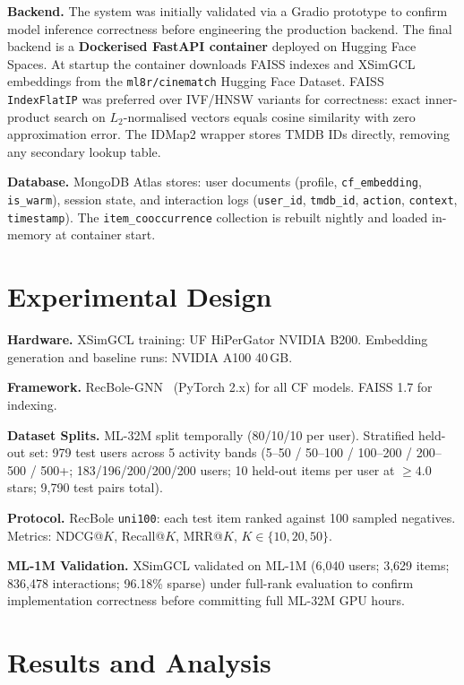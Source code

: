 \documentclass[conference]{IEEEtran}
\begin{document}
\textbf{Backend.}
The system was initially validated via a Gradio prototype to confirm
model inference correctness before engineering the production backend.
The final backend is a \textbf{Dockerised FastAPI container} deployed on
Hugging Face Spaces.
At startup the container downloads FAISS indexes and XSimGCL embeddings
from the \texttt{ml8r/cinematch} Hugging Face Dataset.
FAISS \texttt{IndexFlatIP} was preferred over IVF/HNSW variants for
correctness: exact inner-product search on $L_2$-normalised vectors
equals cosine similarity with zero approximation error.
The IDMap2 wrapper stores TMDB IDs directly, removing any secondary
lookup table.

\textbf{Database.}
MongoDB Atlas stores: user documents (profile, \texttt{cf\_embedding},
\texttt{is\_warm}), session state, and interaction logs
(\texttt{user\_id}, \texttt{tmdb\_id}, \texttt{action},
\texttt{context}, \texttt{timestamp}).
The \texttt{item\_cooccurrence} collection is rebuilt nightly and
loaded in-memory at container start.

\section{Experimental Design}
\label{sec:expdesign}

\textbf{Hardware.}
XSimGCL training: UF HiPerGator NVIDIA B200.
Embedding generation and baseline runs: NVIDIA A100 40\,GB.

\textbf{Framework.}
RecBole-GNN~\cite{recbolegnn} (PyTorch 2.x) for all CF models.
FAISS 1.7 for indexing.

\textbf{Dataset Splits.}
ML-32M split temporally (80/10/10 per user).
Stratified held-out set: 979 test users across 5 activity bands
(5--50 / 50--100 / 100--200 / 200--500 / 500+;
183/196/200/200/200 users; 10 held-out items per user at $\geq4.0$\,stars;
9,790 test pairs total).

\textbf{Protocol.}
RecBole \texttt{uni100}: each test item ranked against 100 sampled negatives.
Metrics: NDCG@$K$, Recall@$K$, MRR@$K$, $K\in\{10,20,50\}$.

\textbf{ML-1M Validation.}
XSimGCL validated on ML-1M (6,040 users; 3,629 items; 836,478
interactions; 96.18\% sparse) under full-rank evaluation to confirm
implementation correctness before committing full ML-32M GPU hours.

\section{Results and Analysis}
\label{sec:results}
\end{document}
